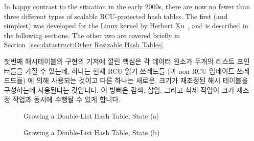 In happy contrast to the situation in the early 2000s, there are now
no fewer than three different types of scalable RCU-protected hash
tables.
The first (and simplest) was developed for the Linux kernel by
Herbert Xu~\cite{HerbertXu2010RCUResizeHash}, and is described in the
following sections.
The other two are covered briefly in
Section~\ref{sec:datastruct:Other Resizable Hash Tables}.
\fi

첫번째 해시테이블의 구현의 기저에 깔린 핵심은 각 데이터 원소가 두개의 리스트
포인터들을 가질 수 있는데, 하나는 현재 RCU 읽기 쓰레드들 (과 non-RCU 업데이트
쓰레드드들) 에 의해 사용되는 것이고 다른 하나는 새로운, 크기가 재조정된 해시
테이블을 구성하는데 사용된다는 것입니다.
이 방뻐은 검색, 삽입, 그리고 삭제 작업이 크기 재조정 작업과 동시에 수행될 수
있게 합니다.

\begin{figure}[tb]
\centering
{}
\caption{Growing a Double-List Hash Table, State (a)}
\label{fig:datastruct:Growing a Double-List Hash Table, State (a)}
\end{figure}

\begin{figure}[tb]
\centering
{}
\caption{Growing a Double-List Hash Table, State (b)}
\label{fig:datastruct:Growing a Double-List Hash Table, State (b)}
\end{figure}

